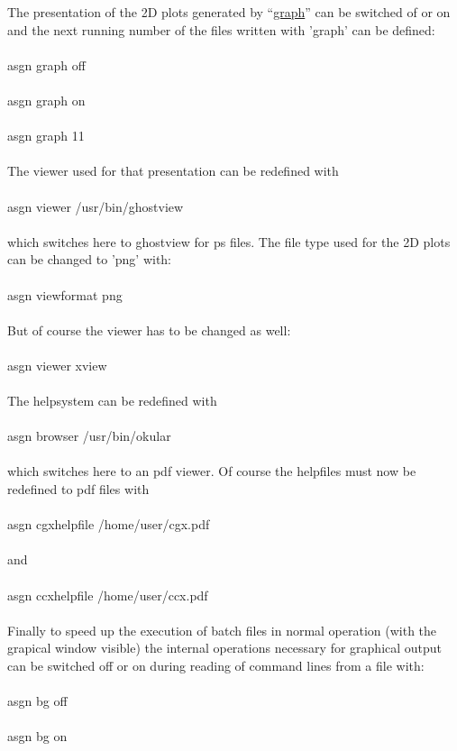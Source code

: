 \documentclass{article}
\providecommand{\htmlref}[2]{\hyperref[#2]{#1}}
\begin{document}
The presentation of the 2D plots generated by ``\htmlref{graph}{graph}'' can be switched of or on and the next running number of the files written with 'graph' can be defined:\\\\asgn graph off\\\\asgn graph on\\\\asgn graph 11\\\\
The viewer used for that presentation can be redefined with\\\\asgn viewer /usr/bin/ghostview\\\\which switches here to ghostview for ps files. The file type used for the 2D plots can be changed to 'png' with:\\\\asgn viewformat png\\\\But of course the viewer has to be changed as well:\\\\asgn viewer xview\\\\

The helpsystem can be redefined with\\\\asgn browser /usr/bin/okular\\\\which switches here to an pdf viewer. Of course the helpfiles must now be redefined to pdf files with\\\\asgn cgxhelpfile /home/user/cgx.pdf\\\\and\\\\asgn ccxhelpfile /home/user/ccx.pdf\\\\

Finally to speed up the execution of batch files in normal operation (with the grapical window visible) the internal operations necessary for graphical output can be switched off or on during reading of command lines from a file with:\\\\asgn bg off\\\\asgn bg on\\\\
\end{document}

